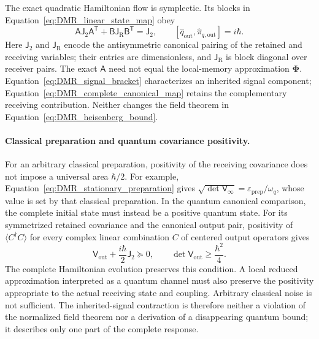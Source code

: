 The exact quadratic Hamiltonian flow is symplectic. Its blocks in Equation~\eqref{eq:DMR_linear_state_map} obey
\begin{equation}
 \mathsf A\mathsf J_2\mathsf A^{\mathsf T}
 +\mathsf B\mathsf J_{\mathrm R}\mathsf B^{\mathsf T}
 =\mathsf J_2,
 \qquad
 [\widehat q_{\mathrm{out}},\widehat\pi_{q,\mathrm{out}}]=i\hbar.
\label{eq:DMR_complete_canonical_map}
\end{equation}
Here $\mathsf J_2$ and $\mathsf J_{\mathrm R}$ encode the antisymmetric canonical pairing of the retained and receiving variables; their entries are dimensionless, and $\mathsf J_{\mathrm R}$ is block diagonal over receiver pairs. The exact $\mathsf A$ need not equal the local-memory approximation $\boldsymbol\Phi$. Equation~\eqref{eq:DMR_signal_bracket} characterizes an inherited signal component; Equation~\eqref{eq:DMR_complete_canonical_map} retains the complementary receiving contribution. Neither changes the field theorem in Equation~\eqref{eq:DMR_heisenberg_bound}.

\paragraph{Classical preparation and quantum covariance positivity.}
For an arbitrary classical preparation, positivity of the receiving covariance does not impose a universal area $\hbar/2$. For example, Equation~\eqref{eq:DMR_stationary_preparation} gives $\sqrt{\det\mathsf V_\infty}=\varepsilon_{\mathrm{prep}}/\omega_q$, whose value is set by that classical preparation. In the quantum canonical comparison, the complete initial state must instead be a positive quantum state. For its symmetrized retained covariance and the canonical output pair, positivity of $\langle C^\dagger C\rangle$ for every complex linear combination $C$ of centered output operators gives
\[
 \mathsf V_{\mathrm{out}}+\frac{i\hbar}{2}\mathsf J_2\succeq0,
 \qquad \det\mathsf V_{\mathrm{out}}\geq\frac{\hbar^2}{4}.
\]
The complete Hamiltonian evolution preserves this condition. A local reduced approximation interpreted as a quantum channel must also preserve the positivity appropriate to the actual receiving state and coupling. Arbitrary classical noise is not sufficient. The inherited-signal contraction is therefore neither a violation of the normalized field theorem nor a derivation of a disappearing quantum bound; it describes only one part of the complete response.


